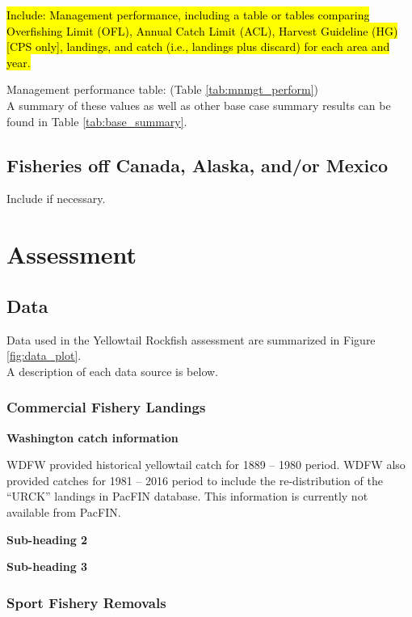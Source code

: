 \documentclass[12pt,]{article}
\begin{document}
\hl{Include: Management performance, including a table or tables comparing 
Overfishing Limit (OFL), Annual Catch Limit (ACL), Harvest Guideline (HG) 
[CPS only], landings, and catch (i.e., landings plus discard) for each area and year.}

Management performance table: (Table \ref{tab:mnmgt_perform})\\
A summary of these values as well as other base case summary results can
be found in Table \ref{tab:base_summary}.

\subsection{Fisheries off Canada, Alaska, and/or
Mexico}\label{fisheries-off-canada-alaska-andor-mexico}

Include if necessary.

\section{Assessment}\label{assessment}

\subsection{Data}\label{data}

Data used in the Yellowtail Rockfish assessment are summarized in Figure
\ref{fig:data_plot}.\\
A description of each data source is below.

\subsubsection{Commercial Fishery
Landings}\label{commercial-fishery-landings}

\textbf{Washington catch information}

WDFW provided historical yellowtail catch for 1889 -- 1980 period. WDFW
also provided catches for 1981 -- 2016 period to include the
re-distribution of the ``URCK'' landings in PacFIN database. This
information is currently not available from PacFIN.

\textbf{Sub-heading 2}

\textbf{Sub-heading 3}

\subsubsection{Sport Fishery Removals}\label{sport-fishery-removals}
\end{document}
